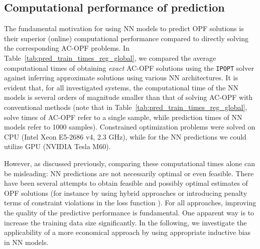 \documentclass[journal]{IEEEtran}
\begin{document}
\subsection{Computational performance of prediction}
The fundamental motivation for using NN models to predict OPF solutions is their superior (online) computational performance compared to directly solving the corresponding AC-OPF problems.
In Table~\ref{tab:pred_train_times_reg_global}, we compared the average computational times of obtaining \textit{exact} AC-OPF solutions using the \texttt{IPOPT} solver against inferring approximate solutions using various NN architectures.
It is evident that, for all investigated systems, the computational time of the NN models is several orders of magnitude smaller than that of solving AC-OPF with conventional methods (note that in Table~\ref{tab:pred_train_times_reg_global}, solve times of AC-OPF refer to a single sample, while prediction times of NN models refer to 1000 samples).
Constrained optimization problems were solved on CPU (Intel Xeon E5-2686 v4, 2.3 GHz), while for the NN predictions we could utilize GPU (NVIDIA Tesla M60).

However, as discussed previously, comparing these computational times alone can be misleading: NN predictions are not necessarily optimal or even feasible.
There have been several attempts to obtain feasible and possibly optimal estimates of OPF solutions (for instance by using hybrid approaches \cite{Zamzam2019, Pan2020} or introducing penalty terms of constraint violations in the loss function \cite{Fioretto2019}).
For all approaches, improving the quality of the predictive performance is fundamental.
One apparent way is to increase the training data size significantly.
In the following, we investigate the applicability of a more economical approach by using appropriate inductive bias in NN models.
\end{document}
